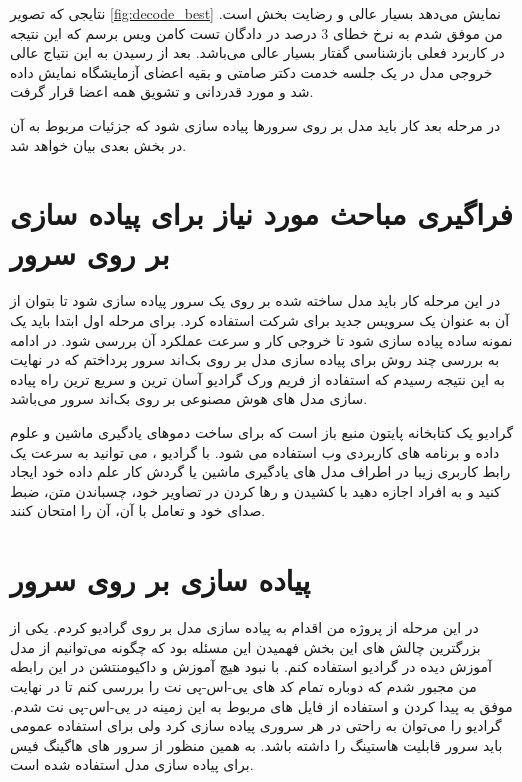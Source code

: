 نتایجی که تصویر \ref{fig:decode_best}
نمایش می‌دهد بسیار عالی و رضایت بخش است. من موفق شدم به نرخ خطای 3 درصد در دادگان تست کامن ویس برسم که این نتیجه در کاربرد فعلی بازشناسی گفتار بسیار عالی می‌باشد. بعد از رسیدن به این نتیاج عالی خروجی مدل در یک جلسه خدمت دکتر صامتی و بقیه اعضای آزمایشگاه نمایش داده شد و مورد قدردانی و تشویق همه اعضا قرار گرفت.

در مرحله بعد کار باید مدل بر روی سرورها پیاده سازی شود که جزئیات مربوط به آن در بخش بعدی بیان خواهد شد.

\section{فراگیری مباحث مورد نیاز برای پیاده سازی بر روی سرور}

در این مرحله کار باید مدل ساخته شده بر روی یک سرور پیاده سازی شود تا بتوان از آن به عنوان یک سرویس جدید برای شرکت استفاده کرد. برای مرحله اول ابتدا باید یک نمونه ساده پیاده سازی شود تا خروجی کار و سرعت عملکرد آن بررسی شود. در ادامه به بررسی چند روش برای پیاده سازی مدل بر روی بک‌اند سرور پرداختم که در نهایت به این نتیجه رسیدم که استفاده از فریم ورک گرادیو آسان ترین و سریع ترین راه پیاده سازی مدل های هوش مصنوعی بر روی بک‌اند سرور می‌باشد.


گرادیو
یک کتابخانه پایتون منبع باز است که برای ساخت دموهای یادگیری ماشین و علوم داده و برنامه های کاربردی وب استفاده می شود.
با 
گرادیو
، می توانید به سرعت یک رابط کاربری زیبا در اطراف مدل های یادگیری ماشین یا گردش کار علم داده خود ایجاد کنید و به افراد اجازه دهید با کشیدن و رها کردن در تصاویر خود، چسباندن متن، ضبط صدای خود و تعامل با آن، آن را امتحان کنند.\cite{abid2019gradio}

\section{پیاده سازی بر روی سرور}
در این مرحله از پروژه من اقدام به پیاده سازی مدل بر روی گرادیو کردم. یکی از بزرگترین چالش های این بخش فهمیدن این مسئله بود که چگونه می‌توانیم از مدل آموزش دیده در گرادیو استفاده کنم. با نبود هیچ آموزش و داکیومنتشن در این رابطه من مجبور شدم که دوباره تمام کد های یی-اس-پی نت را بررسی کنم تا در نهایت موفق به پیدا کردن و استفاده از فایل های مربوط به این زمینه در یی-اس-پی نت شدم.
گرادیو را می‌توان به راحتی در هر سروری پیاده سازی کرد ولی برای استفاده عمومی باید سرور قابلیت هاستینگ را داشته باشد. به همین منظور از سرور های هاگینگ فیس برای پیاده سازی مدل  استفاده شده است.

